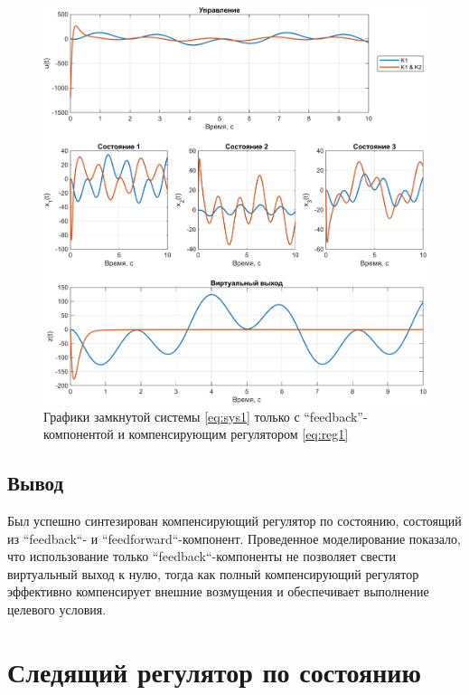 \begin{figure}[H]
    \centering
    \includegraphics[width=\linewidth]{figs/task1_2.png}
    \caption{Графики замкнутой системы \eqref{eq:sys1} только с ``feedback''-компонентой
    и компенсирующим регулятором \eqref{eq:reg1}}
    \label{fig:1.2}
\end{figure}

\subsection{Вывод}

Был успешно синтезирован компенсирующий регулятор по состоянию, 
состоящий из ``feedback``- и ``feedforward``-компонент. Проведенное 
моделирование показало, что использование только ``feedback``-компоненты 
не позволяет свести виртуальный выход к нулю, тогда как полный 
компенсирующий регулятор эффективно компенсирует внешние возмущения 
и обеспечивает выполнение целевого условия.



\section{Следящий регулятор по состоянию}

